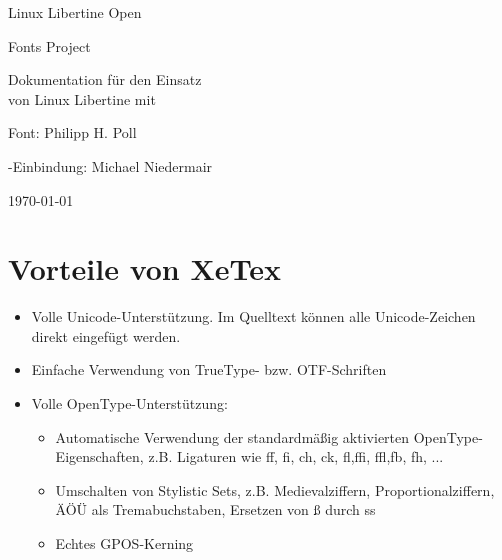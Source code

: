 \documentclass{fontdoku}
\begin{document}
\thispagestyle{empty}

\begin{minipage}{\linewidth}%
   \centering%
   \libertine\fontsize{36pt}{40pt}\selectfont%
   \textcolor{red}{}\quad%
   \fontsize{36pt}{40pt}\selectfont Linux Libertine Open\par
   \hfill\fontsize{36pt}{40pt}\selectfont Fonts Project\quad%
   \fontsize{36pt}{40pt}\selectfont\textcolor{red}{}\par
\end{minipage}

\vfill
\begin{center}
   \fontsize{26pt}{28pt}\selectfont Dokumentation für den Einsatz\\
    von Linux Libertine mit \XeLaTeX
\end{center}

\vfill
\begin{center}\fontsize{20pt}{18pt}\selectfont
Font: Philipp H. Poll\par \XeLaTeX-Einbindung: Michael Niedermair
\end{center}

\vfill
\begin{center}
{\fontsize{6cm}{6cm}\selectfont\Llogo}%
\hfill\fontsize{20pt}{18pt}\selectfont\today
\end{center}
\newpage
\tableofcontents
\newpage
\section{Vorteile von XeTex}

\begin{itemize}
 \item Volle Unicode-Unterstützung. Im Quelltext können alle Unicode-Zeichen direkt eingefügt werden.
 \item Einfache Verwendung von TrueType- bzw. OTF-Schriften
 \item Volle OpenType-Unterstützung:
   \begin{itemize}
   \item Automatische Verwendung der standardmäßig aktivierten OpenType-Eigenschaften, z.B. Ligaturen wie ff, fi, ch, ck, fl,ffi, ffl,fb, fh, ...
    \item Umschalten von Stylistic Sets, z.B. Medievalziffern, Proportionalziffern, ÄÖÜ als Tremabuchstaben, Ersetzen von ß durch ss
    \item Echtes GPOS-Kerning
   \end{itemize}

\end{itemize}
\end{document}
